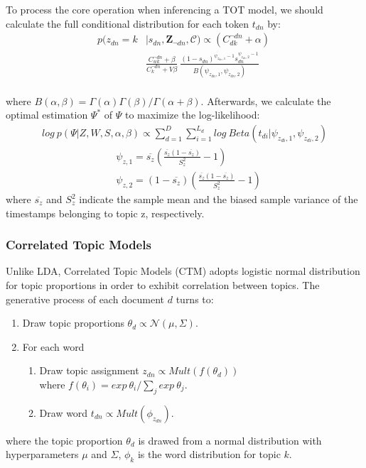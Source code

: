 \documentclass[10pt,journal,cspaper,compsoc]{IEEEtran}
\begin{document}
To process the core operation when inferencing a TOT model, we should calculate the full conditional distribution for each token $t_{dn}$ by:
\begin{align*}
\label{eq:tot_sampling}
p(z_{dn} = k&| s_{dn}, \mathbf{Z}_{\neg dn}, \mathcal{C}) \propto
(C_{dk}^{\neg dn} + \alpha) ~ \\
&\frac{C_{wk}^{\neg dn} + \beta}{C_{k}^{\neg dn} + V\beta}~
\frac{(1-s_{dn})^{\psi_{z_{dn},1}-1}s_{dn}^{\psi_{z_{dn},2}-1}}{B(\psi_{z_{dn},1},\psi_{z_{dn},2})}
\end{align*}
\\
where $B(\alpha,\beta)=\Gamma(\alpha)\Gamma(\beta)/\Gamma(\alpha+\beta)$. Afterwards, we calculate the optimal estimation $\Psi^*$ of $\Psi$ to maximize the log-likelihood:
\begin{align*}
\label{eq:tot_estimating}
log~p(\Psi|Z,W,S,\alpha,\beta) \propto \sum_{d=1}^{D}\sum_{i=1}^{L_d}{log~Beta(t_{di}|\psi_{z_{di},1}, \psi_{z_{di},2})}
\end{align*}
\begin{align*}
\label{eq:tot_solution}
&\psi_{z,1}=\overline{s_z}(\frac{\overline{s_z}(1-\overline{s_z})}{S_z^2}-1)\\
&\psi_{z,2}=(1-\overline{s_z})(\frac{\overline{s_z}(1-\overline{s_z})}{S_z^2}-1)
\end{align*}
where $\overline{s_z}$ and $S_z^2$ indicate the sample mean and the biased sample variance of the timestamps belonging to topic z, respectively.

\subsubsection{Correlated Topic Models}
Unlike LDA, Correlated Topic Models (CTM) adopts logistic normal distribution for topic proportions in order to exhibit correlation between topics. The generative process of each document $d$ turns to:
\begin{enumerate}
	\item Draw topic proportions $\theta_d \propto \mathcal{N}(\mu,\Sigma)$.
	\item For each word
	\begin{enumerate}
		\item Draw topic assignment $z_{dn} \propto Mult(f(\theta_d))$\\
		where $f(\theta_i)={exp\ \theta_i}/{\sum_j{exp\ \theta_j}}$.
		\item Draw word $t_{dn} \propto Mult(\phi_{z_{dn}})$.
	\end{enumerate}
\end{enumerate}
where the topic proportion $\theta_d$ is drawed from a normal distribution with hyperparameters $\mu$ and $\Sigma$, $\phi_k$ is the word distribution for topic $k$.
\end{document}
